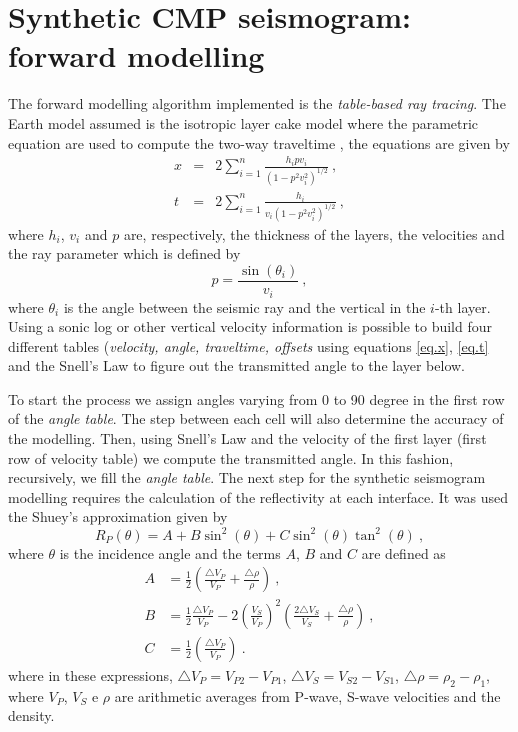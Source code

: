 \documentclass{vie16}
\begin{document}
\section{Synthetic CMP seismogram: forward modelling}
The forward modelling algorithm implemented is the \textit{table-based ray 
tracing}. The Earth model assumed is the isotropic layer cake model where 
the parametric equation are used to compute the two-way traveltime 
\citep{Geyer1959}, the equations are given by
\begin{eqnarray}
x & = & 2\sum_{i=1}^{n} \frac {h_{i}pv_{i}} {(1 -
p^{2}v_{i}^{2})^{1/2}} \ ,\label{eq.x} \\
t & = & 2\sum_{i=1}^{n} \frac {h_{i}} {v_{i}(1 - p^{2}v_{i}^{2})^{1/2}} \ ,
\label{eq.t}
\end{eqnarray}
%
where $h_{i}$, $v_{i}$ and $p$ are, respectively, the thickness of the layers, 
the velocities and the ray parameter which is defined by
\begin{equation}
p = \frac{\sin(\theta_{i})}{v_{i}}\ ,\label{eq.p}
\end{equation}
where $\theta_i$ is the angle between the seismic ray and the vertical in the 
$i$-th layer. Using a sonic log or other vertical velocity information is 
possible to build four different tables (\textit{velocity, angle, traveltime, 
offsets} using equations \ref{eq.x}, \ref{eq.t} and the Snell's Law to figure out 
the transmitted angle to the layer below.

To start the process we assign angles varying from 0 to 90 degree in the first 
row of the \textit{angle table}. The step between each cell will also 
determine the accuracy of the modelling. Then, using Snell's Law and the 
velocity of the first layer (first row of velocity table) we compute the 
transmitted angle. In this fashion, recursively, we fill the \textit{angle table}. 
The next step for the synthetic seismogram modelling requires the 
calculation of the reflectivity at each interface. It was used the Shuey's 
approximation \cite{Shuey1985} given by
\begin{equation}
R_{P} (\theta) = A + B\sin^{2}(\theta) + C\sin^{2}(\theta)\tan^{2}(\theta)
\ , \label{eq.shuey}
\end{equation}
where $\theta$ is the incidence angle and the terms $A$, $B$ and $C$ are 
defined as
\begin{equation}
\begin{split}
A & = \frac{1}{2} \left(\frac{\triangle V_{P}}{V_{P}}     +
\frac{\triangle \rho}{\rho}     \right)\ , \\
B & = \frac{1}{2} \frac{\triangle V_{P}}{V_{P}}  - 2\left(\frac{
V_{S}}{V_{P}}\right)^{2}  \left(\frac{2\triangle V_{S}}{V_{S}} +
\frac{\triangle \rho}{\rho}\right)   \ , \\
C & = \frac{1}{2} \left(\frac{\triangle V_{P}}{V_{P}} \right) \ .
\end{split}
\end{equation}
where in these expressions, $\triangle V_{P} = V_{P2} - V_{P1}$, $\triangle 
V_{S} = V_{S2} - V_{S1}$, $\triangle \rho = \rho_{2} - \rho_{1}$, where 
$V_{P}$, $V_{S}$ e $\rho$ are arithmetic averages from P-wave, S-wave 
velocities and the density.
\end{document}
